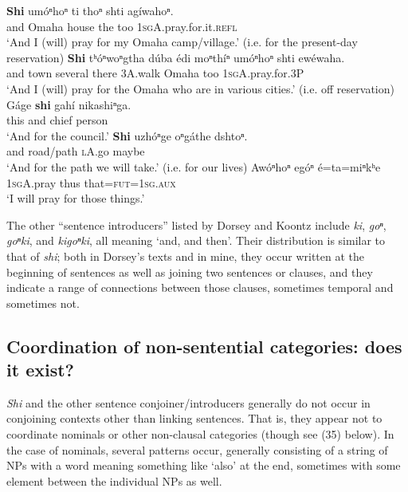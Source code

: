 \documentclass[output=paper]{LSP/langsci}
\begin{document}
\begin{exe}
\begin{xlist}
\ex
\gll	\textbf{Shi}  um\'oⁿhoⁿ 	ti    	thoⁿ 	shti 	ag\'iwahoⁿ.\\
and 	Omaha  	house 	the 	too 	\textsc{1sgA}.pray.for.it.\textsc{refl}\\
\trans `And I (will) pray for my Omaha camp/village.'  (i.e. for the present-day reservation)
\ex
\gll	\textbf{Shi} tʰ\'oⁿwoⁿgtha d\'uba  \'edi moⁿth\'iⁿ um\'oⁿhoⁿ shti ew\'ewaha. \\         
and town several there 3A.walk Omaha  	too 	\textsc{1sgA}.pray.for.3P\\
\trans `And I (will) pray for the Omaha who are in various cities.'  (i.e. off reservation)
\ex
\gll	G\'age \textbf{shi} 	gah\'i 	nikashiⁿga.\\
	this 	and 	chief  	person\\
\trans `And for the council.'
\ex
\gll	\textbf{Shi} uzh\'oⁿge  	oⁿg\'athe 	dshtoⁿ.\\
	and  	road/path 	\textsc{lA}.go  	maybe\\
\trans `And for the path we will take.'  (i.e. for our lives)
\ex
\gll	Aw\'oⁿhoⁿ 	eg\'oⁿ  	\'e=ta=miⁿkʰe\\
	\textsc{1sgA}.pray 	thus 	that=\textsc{fut=1sg.aux}\\
\trans `I will pray for those things.' 
\end{xlist}
\end{exe}	

The other ``sentence introducers'' listed by Dorsey and Koontz include \textit{ki}, \textit{goⁿ}, \textit{goⁿki}, and \textit{kigoⁿki}, all meaning `and, and then'. Their distribution is similar to that of \textit{shi}; both in Dorsey's texts and in mine, they occur written at the beginning of sentences as well as joining two sentences or clauses, and they indicate a range of connections between those clauses, sometimes temporal and sometimes not. 

\subsection{Coordination of non-sentential categories: does it exist?}

\textit{Shi} and the other sentence conjoiner/introducers generally do not occur in conjoining contexts other than linking sentences. That is, they appear not to coordinate nominals or other non-clausal categories (though see (35) below).  In the case of nominals, several patterns occur, generally consisting of a string of NPs with a word meaning something like `also' at the end, sometimes with some element between the individual NPs as well.  
\end{document}
